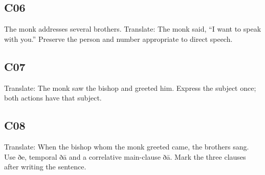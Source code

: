 \par\begin{minipage}{\linewidth}\raggedright
\subsection*{C06}

The monk addresses several brothers. Translate: The monk said, “I want to speak with you.” Preserve the person and number appropriate to direct speech.

\end{minipage}\par\addvspace{4pt}

\par\begin{minipage}{\linewidth}\raggedright
\subsection*{C07}

Translate: The monk saw the bishop and greeted him. Express the subject once; both actions have that subject.

\end{minipage}\par\addvspace{4pt}

\par\begin{minipage}{\linewidth}\raggedright
\subsection*{C08}

Translate: When the bishop whom the monk greeted came, the brothers sang. Use ðe, temporal ðā and a correlative main-clause ðā. Mark the three clauses after writing the sentence.

\end{minipage}\par\addvspace{4pt}

